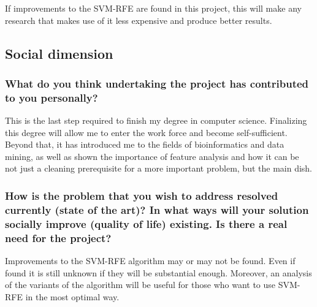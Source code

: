 If improvements to the SVM-RFE are found in this project, this will make any re\-search that makes use of it less expensive and produce better results.

\subsection{Social dimension}

\subsubsection*{What do you think undertaking the project has contributed to you personally?}

This is the last step required to finish my degree in computer science. Finalizing this degree will allow me to enter the work force and become self-sufficient. Beyond that, it has introduced me to the fields of bioinformatics and data mining, as well as shown the importance of feature analysis and how it can be not just a cleaning prerequisite for a more important problem, but the main dish. 

\subsubsection*{How is the problem that you wish to address resolved currently (state of the art)? In what ways will your solution socially improve (quality of life) existing. Is there a real need for the project?}

Improvements to the SVM-RFE algorithm may or may not be found. Even if found it is still unknown if they will be substantial enough. Moreover, an analysis of the variants of the algorithm will be useful for those who want to use SVM-RFE in the most optimal way.
